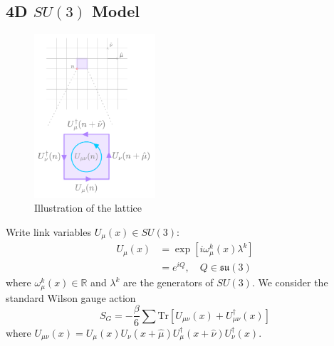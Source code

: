 \documentclass[a4paper,11pt]{article}
\begin{document}
\subsection{\label{subsec:4dSU3}4D \texorpdfstring{$SU(3)$}{SU(3)} Model}
%
\begin{figure}
  \begin{center}
    \includegraphics[width=0.4\textwidth]{assets/lattice}
  \end{center}
  \caption{Illustration of the lattice}
  \label{fig:lattice}
\end{figure}
%
Write link variables $U_{\mu}(x) \in SU(3)$:
%
\begin{align}
U_{\mu}(x) &= \exp\left[i \omega_{\mu}^{k}(x) \lambda^{k} \right] \\
&= e^{iQ}, \quad Q \in \mathfrak{su}(3)
\end{align}
%
where $\omega_{\mu}^{k}(x) \in \mathbb{R}$ and $\lambda^{k}$ are the generators of $SU(3)$.
%
We consider the standard Wilson gauge action
%
\begin{equation}
S_{G} = -\frac{\beta}{6}\sum \mathrm{Tr}\left[U_{\mu\nu}(x) + U^{\dagger}_{\mu\nu}(x) \right]
\end{equation}
%
where $U_{\mu\nu}(x) = U_{\mu}(x) U_{\nu}(x + \hat{\mu}) U_{\mu}^{\dagger}(x + \hat{\nu}) U^{\dagger}_{\nu}(x)$.
%
\end{document}

